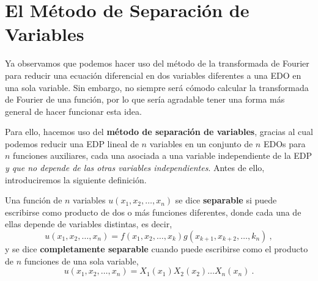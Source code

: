 \chapter{El Método de Separación de Va\-riables} \label{chap:MSV}

Ya observamos que podemos hacer uso del método de la transformada de Fourier para reducir una ecuación diferencial en dos variables diferentes a una EDO en una sola variable. Sin embargo, no siempre será cómodo calcular la transformada de Fourier de una función, por lo que sería agradable tener una forma más general de hacer funcionar esta idea.

Para ello, hacemos uso del \textbf{método de separación de variables}, gracias al cual podemos reducir una EDP lineal de $n$ variables en un conjunto de $n$ EDOs para $n$ funciones auxiliares, cada una asociada a una variable independiente de la EDP \emph{y que no depende de las otras variables independientes}. Antes de ello, introduciremos la siguiente definición.

\begin{defi}
    Una función de $n$ variables $u(x_1, x_2, \dots, x_n)$ se dice \textbf{separable} si puede escribirse como producto de dos o más funciones diferentes, donde cada una de ellas depende de variables distintas, es decir,
    \begin{equation}
        u(x_1, x_2, \dots, x_n) = f(x_1, x_2, \dots, x_k) g(x_{k+1}, x_{k+2}, \dots, k_n) \ ,
    \end{equation}
    y se dice \textbf{completamente separable} cuando puede escribirse como el producto de $n$ funciones de una sola variable,
    \begin{equation}
        u(x_1, x_2, \dots, x_n) = X_1(x_1) X_2(x_2) \dots X_n(x_n) \ .
    \end{equation}
\end{defi}


